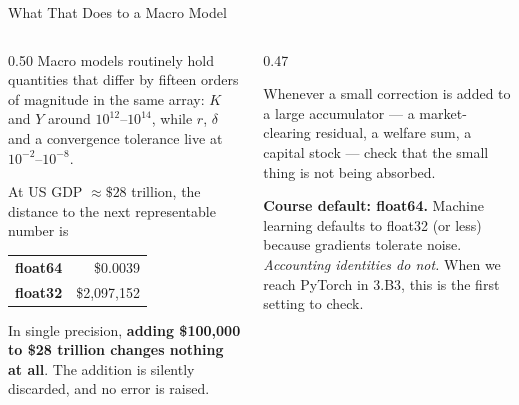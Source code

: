 \begin{frame}{What That Does to a Macro Model}
\begin{columns}[T]
\begin{column}{0.50\textwidth}
\small
Macro models routinely hold quantities that differ by fifteen orders of magnitude in the same array: $K$ and $Y$ around $10^{12}$--$10^{14}$, while $r$, $\delta$ and a convergence tolerance live at $10^{-2}$--$10^{-8}$.
\medskip

At US GDP $\approx\$28$ trillion, the distance to the next representable number is
\begin{center}\footnotesize
\begin{tabular}{@{}lr@{}}
\toprule
\textbf{float64} & \$0.0039 \\
\textbf{float32} & \$2{,}097{,}152 \\
\bottomrule
\end{tabular}
\end{center}
\medskip
In single precision, \textbf{adding \$100{,}000 to \$28 trillion changes nothing at all}. The addition is silently discarded, and no error is raised.
\end{column}
\begin{column}{0.47\textwidth}
\begin{cautionbox}[title=\textbf{The ``big $+$ small'' trap}]\footnotesize
Whenever a small correction is added to a large accumulator --- a market-clearing residual, a welfare sum, a capital stock --- check that the small thing is not being absorbed.
\end{cautionbox}
\medskip
\begin{takeawaybox}\footnotesize
\textbf{Course default: float64.} Machine learning defaults to float32 (or less) because gradients tolerate noise. \emph{Accounting identities do not.} When we reach PyTorch in 3.B3, this is the first setting to check.
\end{takeawaybox}
\end{column}
\end{columns}
\vspace{1mm}
\end{frame}

